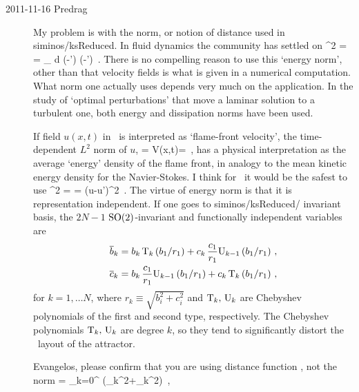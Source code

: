 \begin{description}
\item[2011-11-16 Predrag] My problem is with the norm, or notion of
distance used in siminos/ksReduced. In fluid dynamics the community has
settled on
\beq
  ^2  =  =
\int_\bCell \! d \bx \;
(-') \cdot (-')
\,.
There is no compelling reason to use this {`energy norm'}, other than
that velocity fields is what is given in a numerical computation. What
norm one actually uses depends very much on the application. In the study
of `optimal perturbations' that move a laminar solution to a turbulent
one, both energy \citep{TeHaHe10} and dissipation \citep{LoCaCoPeGo11}
norms have been used.

If field $u(x,t)$ in \KSe\  is interpreted as
`flame-front velocity', the time-dependent $L^2$ norm
of $u$,
\beq
  \expctE= \Lint{\pSpace} V(x,t)= \Lint{\pSpace} 
  \,,
  \label{ksEnergy}
\eeq
has a physical interpretation as the average `energy'
density of the flame front, in analogy to the mean kinetic energy
density for the Navier-Stokes.
I think for \KS\ it would be the safest to use
\beq
  ^2  =  =
\Lint{\pSpace} ({u}-{u}')^2
\,.
The virtue of energy norm is that it is representation independent. If
one goes to siminos/ksReduced/ invariant basis, the $2N-1$
$\SOn{2}$-invariant and functionally independent variables are
\bseq\label{eq:SO2cheb}
  \begin{align}
    \overline{b}_k &=
		    b_k\, \chebT_k\left(b_1/r_1\right)+
		    c_k\,\frac{c_1}{r_1} \chebU_{k-1}\left(b_1/r_1\right)\,, \label{eq:SO2cheb1}\\
    \overline{c}_k &=
		    b_k\, \frac{c_1}{r_1} \chebU_{k-1}\left(b_1/r_1\right)+
		    c_k\,\chebT_k\left(b_1/r_1\right)\,,  \label{eq:SO2cheb2}
  \end{align}
\eseq
for $k=1,\ldots N$, where $r_k\equiv\sqrt{b_i^2+c_i^2}$ and $\mathrm{T}_k,\,\mathrm{U}_k$
are Chebyshev polynomials of the first and second type, respectively.
The Chebyshev polynomials $\mathrm{T}_k,\,\mathrm{U}_k$ are degree $k$, so they tend
to significantly distort the \statesp\ layout of the attractor.

Evangelos, please confirm that you are using distance function ,
not the norm
\beq
{}  =   {\textstyle{}} \sum_{k=0}^{\infty}
   (_k^2+_k^2)
\,,



\end{description}

